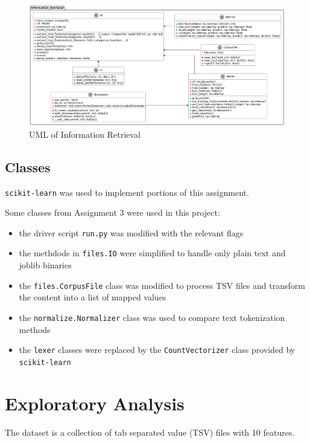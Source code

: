 \documentclass[11pt]{article}
\begin{document}
\begin{figure}[!ht]
    \includegraphics[scale=0.35]{statics/uml.png}
    \centering
    \caption{UML of Information Retrieval}
\end{figure}

\subsection*{Classes}
\texttt{scikit-learn} \cite{scikit-learn} was used to implement portions of this assignment.

Some classes from Assignment 3 were used in this project:
\begin{itemize}
    \item the driver script \texttt{run.py} was modified with the relevant flags
    \item the methdods in \texttt{files.IO} were simplified to handle only plain text and joblib binaries
    \item the \texttt{files.CorpusFile} class was modified to process TSV files and transform the content into a list of mapped values
    \item the \texttt{normalize.Normalizer} class was used to compare text tokenization methods
    \item the \texttt{lexer} classes were replaced by the \texttt{CountVectorizer} class provided by \texttt{scikit-learn}
\end{itemize}

\section*{Exploratory Analysis}
The dataset is a collection of tab separated value (TSV) files with 10 features.
\end{document}
